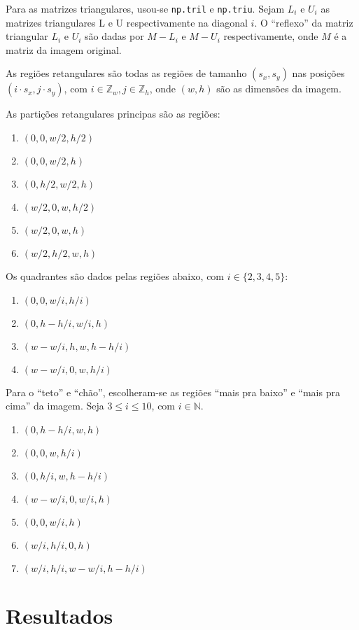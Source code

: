 \documentclass[12pt]{article}
\theoremstyle{plain}
\numberwithin{equation}{section}
\newcommand{\code}[1]{\lstinline[mathescape=true]{#1}}
\begin{document}
Para as matrizes triangulares, usou-se \code{np.tril} e \code{np.triu}. Sejam $L_i$ e $U_i$ as matrizes
triangulares L e U respectivamente na diagonal $i$. O ``reflexo'' da matriz triangular $L_i$ e
$U_i$ são dadas por $M-L_i$ e $M-U_i$ respectivamente, onde $M$ é a matriz da imagem original.

As regiões retangulares são todas as regiões de tamanho $(s_x, s_y)$ nas posições $(i\cdot s_x,
j\cdot s_y)$, com $i\in\mathbb{Z}_w, j\in\mathbb{Z}_h$, onde $(w, h)$ são as dimensões da imagem.

As partições retangulares principas são as regiões:

\begin{enumerate}
  \item $(0, 0, w/2, h/2)$
  \item $(0, 0, w/2, h)$
  \item $(0, h/2, w/2, h)$
  \item $(w/2, 0, w, h/2)$
  \item $(w/2, 0, w, h)$
  \item $(w/2, h/2, w, h)$
\end{enumerate}

Os quadrantes são dados pelas regiões abaixo, com $i\in\{2, 3, 4, 5\}$:

\begin{enumerate}
  \item $(0, 0, w/i, h/i)$
  \item $(0, h-h/i, w/i, h)$
  \item $(w-w/i, h, w, h-h/i)$
  \item $(w-w/i, 0, w, h/i)$
\end{enumerate}

Para o ``teto'' e ``chão'', escolheram-se as regiões ``mais pra baixo'' e ``mais pra cima'' da
imagem. Seja $3\leq i\leq 10$, com $i\in\mathbb{N}$.

\begin{enumerate}
  \item $(0, h-h/i, w, h)$
  \item $(0, 0, w, h/i)$
  \item $(0, h/i, w, h-h/i)$
  \item $(w-w/i, 0, w/i, h)$
  \item $(0, 0, w/i, h)$
  \item $(w/i, h/i, 0, h)$
  \item $(w/i, h/i, w-w/i, h-h/i)$
\end{enumerate}

\section{Resultados}
\end{document}

